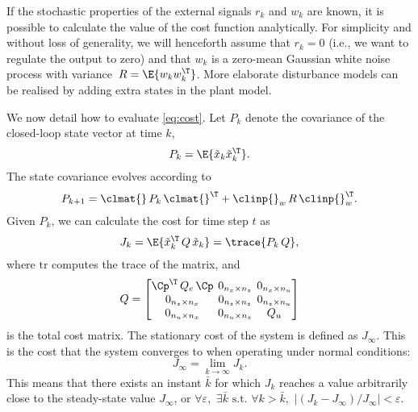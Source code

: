 If the stochastic properties of the external signals $r_k$ and $w_k$ are known, it is possible to calculate the value of the cost function analytically.
For simplicity and without loss of generality, we will henceforth assume that $r_k = 0$ (i.e., we want to regulate the output to zero) and that $w_k$ is a zero-mean Gaussian white noise process with variance~$R=\E{w_k w_k^\T}$.
More elaborate disturbance models can be realised by adding extra states in the plant model.

We now detail how to evaluate \eqref{eq:cost}.
Let $P_k$ denote the covariance of the closed-loop state vector at time $k$,
%
\begin{equation}
\label{eq:covarcalc}
    P_k = \E{\tilde x_k \tilde x_k^\T }.
\end{equation}
%
The state covariance evolves according to
%
\begin{equation}
\label{eq:covevolution}
    P_{k+1} = \clmat{} \,P_k\, \clmat{}^\T + \clinp{}_w \,R\, \clinp{}_w^\T.
\end{equation}
%
Given $P_k$, we can calculate the cost for time step $t$ as
%
\begin{equation}
\label{eq:covartocost}
    J_k = \E{\tilde x_k^\T \,Q\, \tilde x_k } = \trace{P_k \,Q},
\end{equation}
%
where $\mathrm{tr}$ computes the trace of the matrix, and
%
\begin{equation}
    \setlength\arraycolsep{2pt}
    Q = \begin{bmatrix} 
        \Cp^\T\,Q_e\,\Cp                           & 0_{n_x \times n_z} & 0_{n_x \times n_u} \\
        0_{n_z \times n_x}  & 0_{n_z \times n_z}   & 0_{n_z \times n_u} \\
        0_{n_u \times n_x} & 0_{n_u \times n_z}  & Q_u
    \end{bmatrix} 
\end{equation}
%
is the total cost matrix.
The stationary cost of the system is defined as $J_\infty$.
This is the cost that the system converges to when operating under normal conditions:
%
\begin{equation}
    J_\infty = \lim_{k\rightarrow\infty} J_k.
\end{equation}
%
This means that there exists an instant $\bar{k}$ for which $J_k$ reaches a value arbitrarily close to the steady-state value $J_\infty$, or $\forall \varepsilon, \,\, \exists \bar{k} \text{~s.t.~} \forall k>\bar{k},\,\,|(J_k - J_\infty)/J_\infty| < \varepsilon$.

